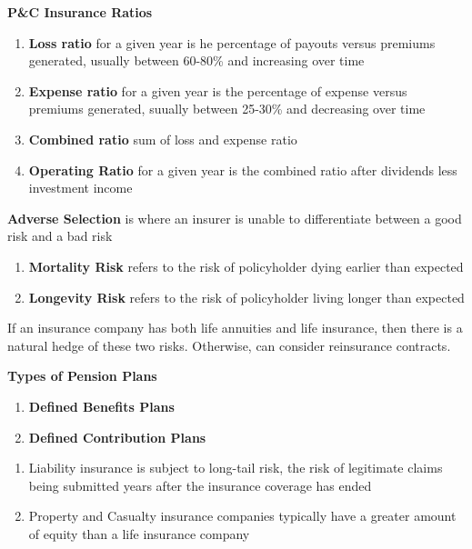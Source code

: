 \documentclass[11pt,fleqn]{report} %
\numberwithin{equation}{section} %
\numberwithin{figure}{section} %
\numberwithin{table}{section} %
\begin{document}
\begin{definition}\textbf{P\&C Insurance Ratios}
\begin{enumerate}
    \item \textbf{Loss ratio} for a given year is he percentage of payouts versus premiums generated, usually between 60-80\% and increasing over time
    \item \textbf{Expense ratio} for a given year is the percentage of expense versus premiums generated, suually between 25-30\% and decreasing over time
    \item \textbf{Combined ratio} sum of loss and expense ratio
    \item \textbf{Operating Ratio} for a given year is the combined ratio after dividends less investment income
\end{enumerate}
\end{definition}
\begin{definition}\textbf{Adverse Selection} is where an insurer is unable to differentiate between a good risk and a bad risk
\end{definition}
\begin{definition}

\begin{enumerate}
    \item \textbf{Mortality Risk} refers to the risk of policyholder dying earlier than expected
    \item \textbf{Longevity Risk} refers to the risk of policyholder living longer than expected
\end{enumerate}
\begin{remark}
If an insurance company has both life annuities and life insurance, then there is a natural hedge of these two risks. Otherwise, can consider reinsurance contracts.
\end{remark}
\end{definition}

\begin{definition}\textbf{Types of Pension Plans}
\begin{enumerate}
    \item \textbf{Defined Benefits Plans}
    \item \textbf{Defined Contribution Plans}
\end{enumerate}
\end{definition}
\begin{remark}
\begin{enumerate}
    \item Liability insurance is subject to long-tail risk, the risk of legitimate claims being submitted years after the insurance coverage has ended
    \item Property and Casualty insurance companies typically have a greater amount of equity than a life insurance company
\end{enumerate}
\end{remark}
\end{document}
